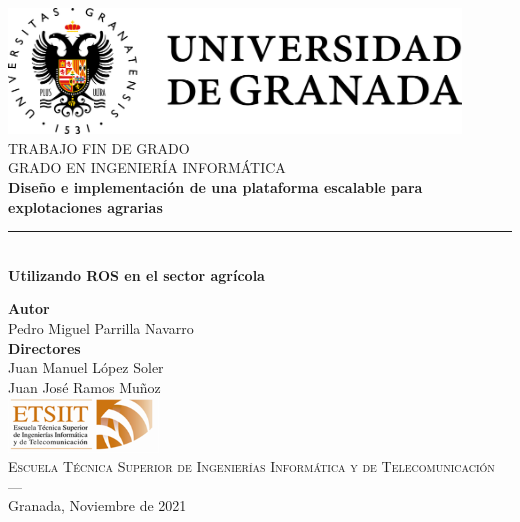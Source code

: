 \begin{titlepage}
\newlength{\centeroffset}
\setlength{\centeroffset}{-0.5\oddsidemargin}
\addtolength{\centeroffset}{0.5\evensidemargin}
\thispagestyle{empty}

\noindent\hspace*{\centeroffset}\begin{minipage}{\textwidth}

\centering
\includegraphics[width=0.9\textwidth]{logos/nuevo_logo_ugr.png}\\[1.4cm]

\textsc{ \Large TRABAJO FIN DE GRADO\\[0.2cm]}
\textsc{ GRADO EN INGENIERÍA INFORMÁTICA}\\[1cm]

{\Huge\bfseries Diseño e implementación de una plataforma escalable para explotaciones agrarias \\}
\noindent\rule[-1ex]{\textwidth}{3pt}\\[3.5ex]
{\large\bfseries Utilizando ROS en el sector agrícola }
\end{minipage}

\vspace{1.5cm}
\noindent\hspace*{\centeroffset}
\begin{minipage}{\textwidth}
\centering

\textbf{Autor}\\ {Pedro Miguel Parrilla Navarro}\\[1ex]
\textbf{Directores}\\ {Juan Manuel López Soler}\\  {Juan José Ramos Muñoz}\\[2cm]
\includegraphics[width=0.3\textwidth]{logos/etsiit_logo.png}\\[0.1cm]
\textsc{Escuela Técnica Superior de Ingenierías Informática y de Telecomunicación}\\
\textsc{---}\\
Granada, Noviembre de 2021
\end{minipage}
\end{titlepage}

\newpage
\thispagestyle{empty}
\mbox{}
\newpage